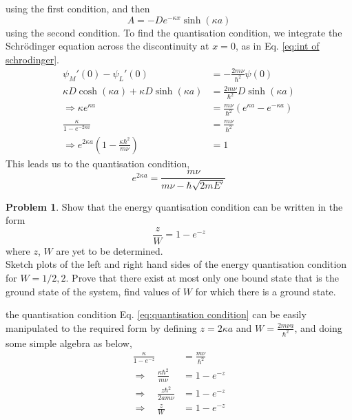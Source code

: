 \documentclass{article}
\theoremstyle{definition}
\newtheorem{definition}{Problem}[section]
\theoremstyle{remark}
\begin{document}
using the first condition, and then
\begin{equation*}
    A = -De^{-\kappa x}\sinh(\kappa a)
\end{equation*}
using the second condition. To find the quantisation condition, we integrate the Schr\"odinger equation across the discontinuity at $x=0$, as in Eq. \ref{eq:int of schrodinger}.
\begin{align*}
    \psi_M'(0) - \psi_L'(0) &= -\frac{2m\nu}{\hbar^2}\psi(0)\\
    \kappa D \cosh(\kappa a) + \kappa D \sinh(\kappa a) &= \frac{2m\nu}{\hbar^2}D\sinh(\kappa a)\\
    \Rightarrow \kappa e^{\kappa a} &= \frac{m\nu}{\hbar^2}(e^{\kappa a} - e^{-\kappa a})\\
    \frac{\kappa}{1-e^{-2\kappa a}} &= \frac{m\nu}{\hbar^2}\\
    \Rightarrow e^{2\kappa a} \left(1 - \frac{\kappa\hbar^2}{m\nu}\right) &= 1
\end{align*}
This leads us to the quantisation condition,
\begin{equation}
    \label{eq:quantisation condition}
    e^{2\kappa a} = \frac{m\nu}{m\nu - \hbar\sqrt{2mE'}}
\end{equation}
\begin{definition}
    Show that the energy quantisation condition can be written in the form
    \begin{equation}
        \label{eq:quantisation condition form}
        \frac{z}{W} = 1 - e^{-z}
    \end{equation}
    where $z$, $W$ are yet to be determined.\\
    Sketch plots of the left and right hand sides of the energy quantisation condition for $W=1/2, 2$.
    Prove that there exist at most only one bound state that is the ground state of the system, find values of $W$ for which there is a ground state.
\end{definition}
the quantisation condition Eq. \ref{eq:quantisation condition} can be easily manipulated to the required form by defining $z = 2\kappa a$ and $W = \frac{2m\nu a}{\hbar^2}$, and doing some simple algebra as below,
\begin{align*}
    \frac{\kappa}{1-e^{-z}} &= \frac{m\nu}{\hbar^2}\\
    \Rightarrow \quad \frac{\kappa \hbar^2}{m\nu} &= 1 - e^{-z}\\
    \Rightarrow \quad \frac{z\hbar^2}{2am\nu} &= 1 - e^{-z}\\
    \Rightarrow \quad \frac{z}{W} & = 1-e^{-z}
\end{align*}
\end{document}
